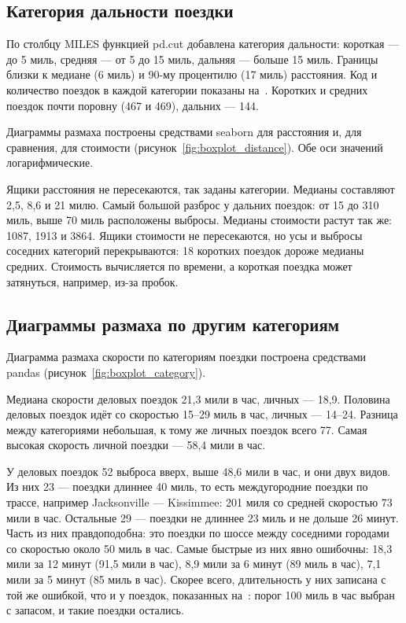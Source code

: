 \documentclass[a4paper,14pt]{extarticle}
\begin{document}
\subsection{Категория дальности поездки}

По столбцу MILES функцией pd.cut добавлена категория дальности: короткая — до 5 миль, средняя — от 5 до 15 миль, дальняя — больше 15 миль. Границы близки к медиане (6 миль) и 90-му процентилю (17 миль) расстояния. Код и количество поездок в каждой категории показаны на~. Коротких и средних поездок почти поровну (467 и 469), дальних — 144.


Диаграммы размаха построены средствами seaborn для расстояния и, для сравнения, для стоимости (рисунок~\ref{fig:boxplot_distance}). Обе оси значений логарифмические.


Ящики расстояния не пересекаются, так заданы категории. Медианы составляют 2,5, 8,6 и 21 милю. Самый большой разброс у дальних поездок: от 15 до 310 миль, выше 70 миль расположены выбросы. Медианы стоимости растут так же: 1087, 1913 и 3864. Ящики стоимости не пересекаются, но усы и выбросы соседних категорий перекрываются: 18 коротких поездок дороже медианы средних. Стоимость вычисляется по времени, а короткая поездка может затянуться, например, из-за пробок.

\subsection{Диаграммы размаха по другим категориям}

Диаграмма размаха скорости по категориям поездки построена средствами pandas (рисунок~\ref{fig:boxplot_category}).


Медиана скорости деловых поездок 21,3 мили в час, личных — 18,9. Половина деловых поездок идёт со скоростью 15–29 миль в час, личных — 14–24. Разница между категориями небольшая, к тому же личных поездок всего 77. Самая высокая скорость личной поездки — 58,4 мили в час.

У деловых поездок 52 выброса вверх, выше 48,6 мили в час, и они двух видов. Из них 23 — поездки длиннее 40 миль, то есть междугородние поездки по трассе, например Jacksonville — Kissimmee: 201 миля со средней скоростью 73 мили в час. Остальные 29 — поездки не длиннее 23 миль и не дольше 26 минут. Часть из них правдоподобна: это поездки по шоссе между соседними городами со скоростью около 50 миль в час. Самые быстрые из них явно ошибочны: 18,3 мили за 12 минут (91,5 мили в час), 8,9 мили за 6 минут (89 миль в час), 7,1 мили за 5 минут (85 миль в час). Скорее всего, длительность у них записана с той же ошибкой, что и у поездок, показанных на~: порог 100 миль в час выбран с запасом, и такие поездки остались.
\end{document}
